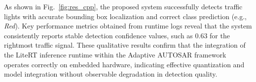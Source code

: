 



As shown in Fig.~\ref{fig:res_cpp}, the proposed system successfully detects traffic lights with accurate bounding box localization and correct class prediction (e.g., \textit{Red}). Key performance metrics obtained from runtime logs reveal that the system consistently reports stable detection confidence values, such as 0.63 for the rightmost traffic signal. These qualitative results confirm that the integration of the LiteRT inference runtime within the Adaptive AUTOSAR framework operates correctly on embedded hardware, indicating effective quantization and model integration without observable degradation in detection quality.

